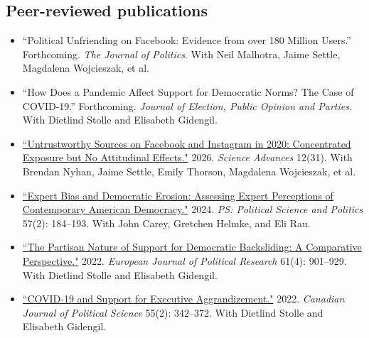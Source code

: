 \documentclass[margin, 10pt]{res}
\begin{document}
\begin{resume}
\section{Peer-reviewed publications}
\begin{itemize}
	
	\item ``Political Unfriending on Facebook: Evidence from over 180 Million Users.'' Forthcoming. \textit{The Journal of Politics}. With Neil Malhotra, Jaime Settle, Magdalena Wojcieszak, et al.
	
	\item ``How Does a Pandemic Affect Support for Democratic Norms? The Case of COVID-19.'' Forthcoming. \textit{Journal of Election, Public Opinion and Parties}. With Dietlind Stolle and Elisabeth Gidengil.
	
	\item \href{https://doi.org/10.1126/sciadv.adz6502}{``Untrustworthy Sources on Facebook and Instagram in 2020:
		Concentrated Exposure but No Attitudinal Eﬀects."}  2026.  \textit{Science Advances} 12(31). With Brendan Nyhan, Jaime Settle, Emily Thorson, Magdalena Wojcieszak, et al.

	\item \href{https://www.cambridge.org/core/journals/ps-political-science-and-politics/article/expert-bias-and-democratic-erosion-assessing-expert-perceptions-of-contemporary-american-democracy/0620719DD8C8A4FE1055AF268A3732E0}{``Expert Bias and Democratic Erosion: Assessing Expert Perceptions of Contemporary American Democracy."}  2024.  \textit{PS: Political Science and Politics} 57(2): 184--193. With John Carey, Gretchen Helmke, and Eli Rau.

	\item \href{https://ejpr.onlinelibrary.wiley.com/doi/10.1111/1475-6765.12502}{``The Partisan Nature of Support for Democratic Backsliding: A Comparative Perspective."} 2022. \textit{European Journal of Political Research} 61(4): 901--929. With Dietlind Stolle and Elisabeth Gidengil.

	\item \href{https://www.cambridge.org/core/journals/canadian-journal-of-political-science-revue-canadienne-de-science-politique/article/covid19-and-support-for-executive-aggrandizement/51E9E60701AAEF93C01EB3D2E8BE0A69}{``COVID-19 and Support for Executive Aggrandizement."} 2022. \textit{Canadian Journal of Political Science} 55(2): 342--372. With Dietlind Stolle and Elisabeth Gidengil.

\end{itemize}


\end{resume}
\end{document}
